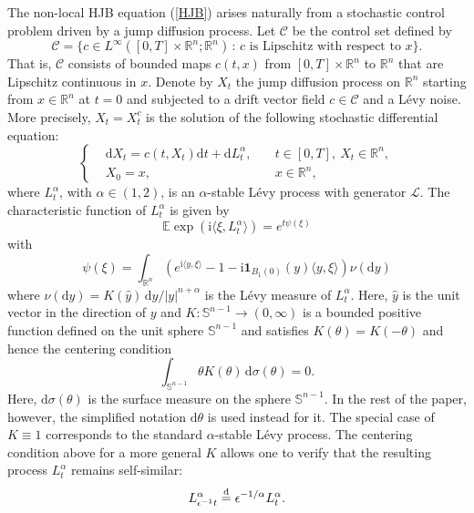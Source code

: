 \documentclass[11pt,reqno]{amsart}
\theoremstyle{definition}
\theoremstyle{remark}
\numberwithin{equation}{section}
\def\eqdistr{\overset{\text d}{=}}
\def\upd{\mathrm{d}}
\newcommand{\R}{{\mathbb{R}}}
\newcommand{\myi}{\mathrm{i}}
\begin{document}
The non-local HJB equation (\ref{HJB}) arises naturally from a stochastic control problem driven by a jump diffusion process. Let $\mathscr{C}$ be the control set defined by 
\begin{equation}
\label{eq:controlset}
\mathscr{C} = \{c \in L^\infty([0,T]\times \R^n;\R^n) \,:\, c \text{ is Lipschitz with respect to $x$}\}.
\end{equation}
That is, $\mathscr{C}$ consists of bounded maps $c(t,x)$ from $[0,T]\times\mathbb{R}^n$ to $\mathbb{R}^n$ that are Lipschitz continuous in $x$. 
Denote by $X_t$ the jump diffusion process on $\mathbb{R}^n$ starting from $x\in\mathbb{R}^n$ at $t=0$ and subjected to a drift vector field $c \in \mathscr{C}$ and a L\'evy noise. More precisely, $X_t = X_t^c$ is the solution of the following stochastic differential equation:
\begin{equation}\label{SDElevy}
  \left\{
   \begin{aligned}
   & \upd X_t = c(t,X_t)\mathrm{d}t +  \mathrm{d}L^{\alpha}_t,\quad & t\in [0,T], \ X_t \in \mathbb{R}^n, \\
   &  X_0 = x, \quad & x\in \mathbb{R}^n,
   \end{aligned}
   \right.
\end{equation}
where $L^{\alpha}_t$, with $\alpha \in (1,2)$, is an $\alpha$-stable L\'{e}vy process with generator $\mathscr{L}$. The characteristic function of $L^\alpha_t$ is given by
\begin{equation*}
    \mathbb{E}\exp(\myi\langle \xi, L^{\alpha}_t \rangle) = e^{t \psi(\xi)}
\end{equation*}
with 
\begin{equation*}
    \psi(\xi) = \int_{\mathbb{R}^n} \left(e^{\myi \langle y, \xi \rangle} -1 - \myi\mathbf{1}_{B_{1}(0)}(y)\langle y, \xi \rangle  \right) \nu(\mathrm{d}y)
\end{equation*}
where $\nu(\mathrm{d}y) = K(\hat{y})\,\mathrm{d}y/|y|^{n+\alpha}$ is the L\'{e}vy measure of $L^{\alpha}_{t}$. Here, $\hat{y}$ is the unit vector in the direction of $y$ and $K: \mathbb{S}^{n-1} \to (0,\infty)$ is a bounded positive function defined on the unit sphere $\mathbb{S}^{n-1}$ and satisfies $K(\theta) = K(-\theta)$ and hence the centering condition
\begin{equation}
    \label{eq:Ksym}
    \int_{\mathbb{S}^{n-1}} \theta K(\theta)\,\upd\sigma(\theta) = 0.
\end{equation}
Here, $\upd\sigma(\theta)$ is the surface measure on the sphere $\mathbb{S}^{n-1}$. In the rest of the paper, however, the simplified notation $\upd\theta$ is used instead for it. The special case of $K\equiv 1$ corresponds to the standard $\alpha$-stable L\'evy process. The centering condition above for a more general $K$ allows one to verify that the resulting process $L^{\alpha}_{t}$ remains self-similar:
\begin{equation}
    \label{eq:Ltass}
    L^{\alpha}_{\epsilon^{-1}t} \eqdistr \epsilon^{-1/\alpha} L^{\alpha}_{t}.
\end{equation}
\end{document}
